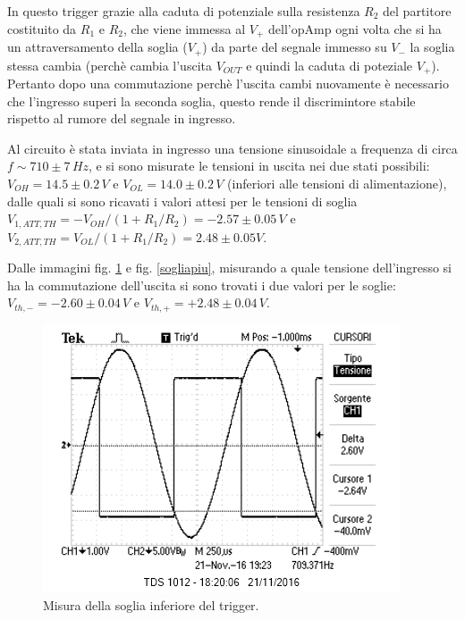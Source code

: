 \documentclass[10pt,a4paper]{article}
\begin{document}
In questo trigger grazie alla caduta di potenziale sulla resistenza $R_2$ del partitore costituito da $R_1$ e $R_2$, che viene immessa al $V_{+}$ dell'opAmp ogni volta che si ha un attraversamento della soglia ($V_{+}$) da parte del segnale immesso su $V_{-}$ la soglia stessa cambia (perchè cambia l'uscita $V_{OUT}$ e quindi la caduta di poteziale $V_{+}$). Pertanto dopo una commutazione perchè l'uscita cambi nuovamente è necessario che l'ingresso superi la seconda soglia, questo rende il discrimintore stabile rispetto al rumore del segnale in ingresso.

Al circuito è stata inviata in ingresso una tensione sinusoidale a frequenza di circa $f \sim 710 \pm 7 \, Hz$, e si sono misurate le tensioni in uscita nei due stati possibili: $V_{OH} = 14.5\pm 0.2 \, V$ e $V_{OL} = 14.0\pm0.2 \, V$ (inferiori alle tensioni di alimentazione), dalle quali si sono ricavati i valori attesi per le tensioni di soglia $V_{1,ATT,TH}= -V_{OH}/(1+R_1/R_2)= -2.57 \pm 0.05 \, V$ e $V_{2,ATT,TH}= V_{OL}/(1+R_1/R_2) = 2.48 \pm 0.05 V$. 

Dalle immagini fig. \ref{sogliameno} e fig. \ref{sogliapiu}, misurando a quale tensione dell'ingresso si ha la commutazione dell'uscita si sono trovati i due valori per le soglie: $V_{th, -} =-2.60 \pm 0.04 \, V $ e $V_{th, +} = +2.48 \pm 0.04 \, V$.

\begin{figure}[htb!]
\centering
\includegraphics[scale=1.0]{immagini/FotoRicordoVth1.png}
\caption{Misura della soglia inferiore del trigger.}
\label{sogliameno}
\end{figure}
\end{document}
